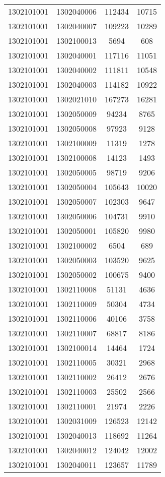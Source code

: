 \begin{longtable}[h]{llcc}
		1302101001 & 1302040006 & 112434 & 10715\\
		1302101001 & 1302040007 & 109223 & 10289\\
		1302101001 & 1302100013 & 5694 & 608\\
		1302101001 & 1302040001 & 117116 & 11051\\
		1302101001 & 1302040002 & 111811 & 10548\\
		1302101001 & 1302040003 & 114182 & 10922\\
		1302101001 & 1302021010 & 167273 & 16281\\
		1302101001 & 1302050009 & 94234 & 8765\\
		1302101001 & 1302050008 & 97923 & 9128\\
		1302101001 & 1302100009 & 11319 & 1278\\
		1302101001 & 1302100008 & 14123 & 1493\\
		1302101001 & 1302050005 & 98719 & 9206\\
		1302101001 & 1302050004 & 105643 & 10020\\
		1302101001 & 1302050007 & 102303 & 9647\\
		1302101001 & 1302050006 & 104731 & 9910\\
		1302101001 & 1302050001 & 105820 & 9980\\
		1302101001 & 1302100002 & 6504 & 689\\
		1302101001 & 1302050003 & 103520 & 9625\\
		1302101001 & 1302050002 & 100675 & 9400\\
		1302101001 & 1302110008 & 51131 & 4636\\
		1302101001 & 1302110009 & 50304 & 4734\\
		1302101001 & 1302110006 & 40106 & 3758\\
		1302101001 & 1302110007 & 68817 & 8186\\
		1302101001 & 1302100014 & 14464 & 1724\\
		1302101001 & 1302110005 & 30321 & 2968\\
		1302101001 & 1302110002 & 26412 & 2676\\
		1302101001 & 1302110003 & 25502 & 2566\\
		1302101001 & 1302110001 & 21974 & 2226\\
		1302101001 & 1302031009 & 126523 & 12142\\
		1302101001 & 1302040013 & 118692 & 11264\\
		1302101001 & 1302040012 & 124042 & 12002\\
		1302101001 & 1302040011 & 123657 & 11789\\

\end{longtable}
